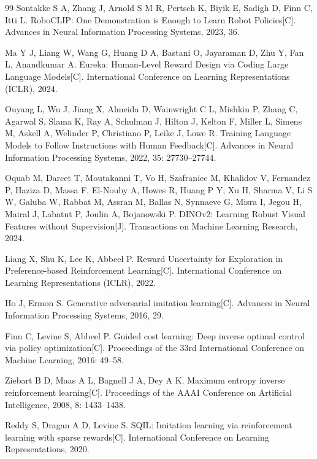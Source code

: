 \begin{thebibliography}{99}
    Sontakke S A, Zhang J, Arnold S M R, Pertsch K, Biyik E, Sadigh D, Finn C, Itti L.
    RoboCLIP: One Demonstration is Enough to Learn Robot Policies[C].
    Advances in Neural Information Processing Systems, 2023, 36.

    Ma Y J, Liang W, Wang G, Huang D A, Bastani O, Jayaraman D, Zhu Y, Fan L, Anandkumar A.
    Eureka: Human-Level Reward Design via Coding Large Language Models[C].
    International Conference on Learning Representations (ICLR), 2024.
    
    Ouyang L, Wu J, Jiang X, Almeida D, Wainwright C L, Mishkin P, Zhang C, Agarwal S, Slama K, Ray A, Schulman J, Hilton J, Kelton F, Miller L, Simens M, Askell A, Welinder P, Christiano P, Leike J, Lowe R.
    Training Language Models to Follow Instructions with Human Feedback[C].
    Advances in Neural Information Processing Systems, 2022, 35: 27730--27744.
    
    Oquab M, Darcet T, Moutakanni T, Vo H, Szafraniec M, Khalidov V, Fernandez P, Haziza D, Massa F, El-Nouby A, Howes R, Huang P Y, Xu H, Sharma V, Li S W, Galuba W, Rabbat M, Assran M, Ballas N, Synnaeve G, Misra I, Jegou H, Mairal J, Labatut P, Joulin A, Bojanowski P.
    DINOv2: Learning Robust Visual Features without Supervision[J].
    Transactions on Machine Learning Research, 2024.
    
    Liang X, Shu K, Lee K, Abbeel P.
    Reward Uncertainty for Exploration in Preference-based Reinforcement Learning[C].
    International Conference on Learning Representations (ICLR), 2022.
    
    Ho J, Ermon S.
    Generative adversarial imitation learning[C].
    Advances in Neural Information Processing Systems, 2016, 29.
    
    Finn C, Levine S, Abbeel P.
    Guided cost learning: Deep inverse optimal control via policy optimization[C].
    Proceedings of the 33rd International Conference on Machine Learning, 2016: 49--58.
    
    Ziebart B D, Maas A L, Bagnell J A, Dey A K.
    Maximum entropy inverse reinforcement learning[C].
    Proceedings of the AAAI Conference on Artificial Intelligence, 2008, 8: 1433--1438.
    
    Reddy S, Dragan A D, Levine S.
    SQIL: Imitation learning via reinforcement learning with sparse rewards[C].
    International Conference on Learning Representations, 2020.
    

\end{thebibliography}
